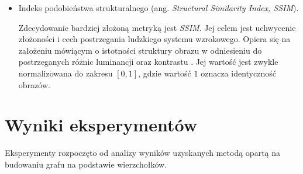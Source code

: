 {{\begin{itemize}
            Jest udoskonaleniem błędu średniokwadratowego, gdyż metryka ta uzależnia swoją wartość od maksymalnej
            wartości przyjmowanej przez sygnał. Oznacza to, że taka sama wartość \textit{PSNR} odpowiada różnicom
            będących w proporcjonalnym do ilości informacji. Przykładowo, w przypadku \textit{MSE} ta sama wartość
            będzie przekładać się na różną postrzegalność błędu w obrazie korzystającym z 8 i 24 bitów na kanał.
            Szczytowy stosunek sygnału do szumu rozwiązuje powyższy problem. W związku z dużym zakresem przyjmowanych
            wartości metryka korzysta z skali logarytmicznej. Wartościami typowymi przy analizie obrazów korzystających
            z 8 bitów na jeden kanał jest zakres $[30dB, 50dB]$, przy czym wyższa wartość oznacza mniejszą degradację.
            Wartość metryki można wyznaczyć za pomocą wzoru:

            \begin{equation}\label{eqt:psnr}
                \mathit{PSNR} = 10 \cdot log_{10} \frac{\mathit{MAX}^2}{\mathit{MSE}}
            \end{equation}

            gdzie:

            \item Indeks podobieństwa strukturalnego (ang. \textit{Structural Similarity Index, SSIM}).

            Zdecydowanie bardziej złożoną metryką jest \textit{SSIM}. Jej celem jest uchwycenie złożoności i cech
            postrzegania ludzkiego systemu wzrokowego. Opiera się na założeniu mówiącym o istotności struktury obrazu w
            odniesieniu do postrzeganych różnic luminancji oraz kontrastu \cite{Wang2004ImageQA, Sara2019ImageQA}. Jej
            wartość jest zwykle normalizowana do zakresu $[0, 1]$, gdzie wartość $1$ oznacza identyczność obrazów.
        \end{itemize}
    }

    \section{Wyniki eksperymentów}
    {
        Eksperymenty rozpoczęto od analizy wyników uzyskanych metodą opartą na budowaniu grafu na podstawie
        wierzchołków.

}}
